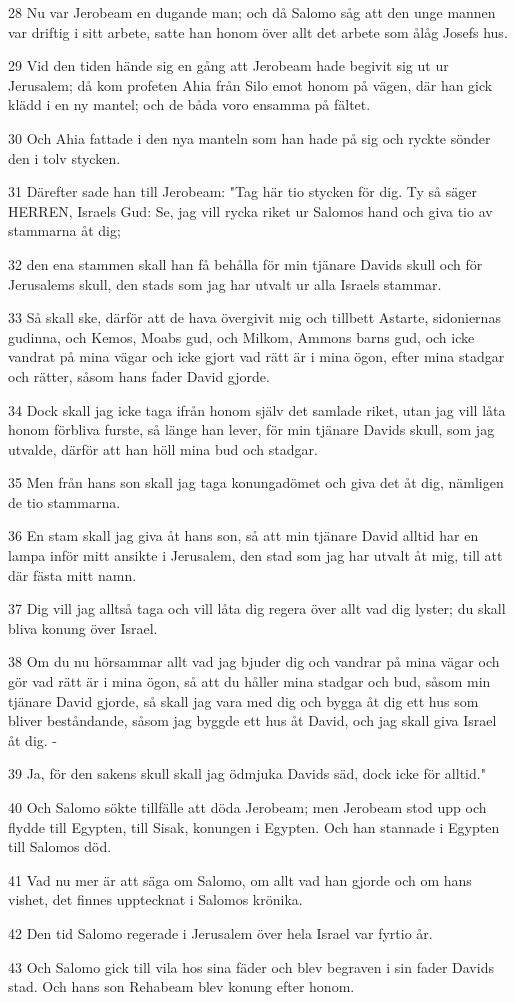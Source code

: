 \par 28 Nu var Jerobeam en dugande man; och då Salomo såg att den unge mannen var driftig i sitt arbete, satte han honom över allt det arbete som ålåg Josefs hus.
\par 29 Vid den tiden hände sig en gång att Jerobeam hade begivit sig ut ur Jerusalem; då kom profeten Ahia från Silo emot honom på vägen, där han gick klädd i en ny mantel; och de båda voro ensamma på fältet.
\par 30 Och Ahia fattade i den nya manteln som han hade på sig och ryckte sönder den i tolv stycken.
\par 31 Därefter sade han till Jerobeam: "Tag här tio stycken för dig. Ty så säger HERREN, Israels Gud: Se, jag vill rycka riket ur Salomos hand och giva tio av stammarna åt dig;
\par 32 den ena stammen skall han få behålla för min tjänare Davids skull och för Jerusalems skull, den stads som jag har utvalt ur alla Israels stammar.
\par 33 Så skall ske, därför att de hava övergivit mig och tillbett Astarte, sidoniernas gudinna, och Kemos, Moabs gud, och Milkom, Ammons barns gud, och icke vandrat på mina vägar och icke gjort vad rätt är i mina ögon, efter mina stadgar och rätter, såsom hans fader David gjorde.
\par 34 Dock skall jag icke taga ifrån honom själv det samlade riket, utan jag vill låta honom förbliva furste, så länge han lever, för min tjänare Davids skull, som jag utvalde, därför att han höll mina bud och stadgar.
\par 35 Men från hans son skall jag taga konungadömet och giva det åt dig, nämligen de tio stammarna.
\par 36 En stam skall jag giva åt hans son, så att min tjänare David alltid har en lampa inför mitt ansikte i Jerusalem, den stad som jag har utvalt åt mig, till att där fästa mitt namn.
\par 37 Dig vill jag alltså taga och vill låta dig regera över allt vad dig lyster; du skall bliva konung över Israel.
\par 38 Om du nu hörsammar allt vad jag bjuder dig och vandrar på mina vägar och gör vad rätt är i mina ögon, så att du håller mina stadgar och bud, såsom min tjänare David gjorde, så skall jag vara med dig och bygga åt dig ett hus som bliver beståndande, såsom jag byggde ett hus åt David, och jag skall giva Israel åt dig. -
\par 39 Ja, för den sakens skull skall jag ödmjuka Davids säd, dock icke för alltid."
\par 40 Och Salomo sökte tillfälle att döda Jerobeam; men Jerobeam stod upp och flydde till Egypten, till Sisak, konungen i Egypten. Och han stannade i Egypten till Salomos död.
\par 41 Vad nu mer är att säga om Salomo, om allt vad han gjorde och om hans vishet, det finnes upptecknat i Salomos krönika.
\par 42 Den tid Salomo regerade i Jerusalem över hela Israel var fyrtio år.
\par 43 Och Salomo gick till vila hos sina fäder och blev begraven i sin fader Davids stad. Och hans son Rehabeam blev konung efter honom.

